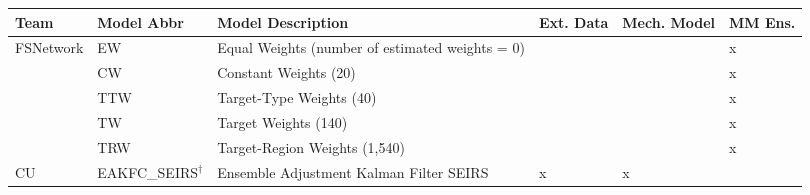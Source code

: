 \begin{table*}
\setlength{\tabcolsep}{4pt} 
\begin{tabular}{p{1.6cm} l p{8.2cm} p{.6cm}  p{.8cm} p{.8cm}}
\hline
Team     & Model Abbr& Model Description & Ext. Data & Mech. Model & MM Ens. \\ 
\hline

FSNetwork & EW       & Equal Weights (number of estimated weights = 0) & ~  & & x\\
 & CW       & Constant Weights (20)& & & x  \\
 & TTW      & Target-Type Weights (40) & & & x \\ 
 & TW       & Target Weights (140) & & & x \\ 
 & TRW      & Target-Region Weights (1,540) & & & x \\ 
\hline
CU       & EAKFC\_SEIRS$^\dagger$       & Ensemble Adjustment Kalman Filter SEIRS\cite{Pei2017}  & x & x & \\ 


\end{tabular}
\end{table*}
